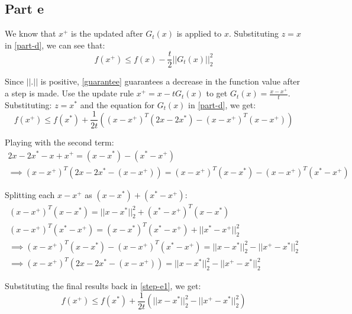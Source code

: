 \documentclass[10.5pt]{article}
\begin{document}
\begin{flushleft}
\subsection*{Part e}
We know that \(x^{+}\) is the updated after \(G_{t}(x)\) is applied to \(x\). Substituting \(z = x\) in \ref{part-d}, we can see that:
\begin{equation}
\label{guarantee}
f(x^{+}) \leq f(x) - \frac{t}{2}||G_{t}(x)||_{2}^{2}
\end{equation}

Since \(||.||\) is positive, \ref{guarantee} guarantees a decrease in the function value after a step is made. Use the update rule \(x^{+} = x - tG_{t}(x)\) to get \(G_{t}(x) = \frac{x - x^{+}}{t}\). Substituting: \(z = x^{*}\) and the equation for \(G_{t}(x)\) in \ref{part-d}, we get:
\begin{equation}
\label{step-e1}
f(x^{+}) \leq f(x^{*}) + \frac{1}{2t}\left((x - x^{+})^{T}(2x - 2x^{*}) - (x - x^{+})^{T}(x - x^{+})\right)
\end{equation}

Playing with the second term:
\begin{gather*}
2x - 2x^{*} - x + x^{+} = (x - x^{*}) - (x^{*} - x^{+}) \\
\implies (x - x^{+})^{T}(2x - 2x^{*} - (x - x^{+})) = (x - x^{+})^{T}(x - x^{*}) - (x - x^{+})^{T}(x^{*} - x^{+})
\end{gather*}

Splitting each \(x - x^{+}\) as \((x - x^{*}) + (x^{*} - x^{+})\):
\begin{gather*}
(x - x^{+})^{T}(x - x^{*}) = ||x - x^{*}||_{2}^{2} + (x^{*} - x^{+})^{T}(x - x^{*}) \\
(x - x^{+})^{T}(x^{*} - x^{+}) = (x - x^{*})^{T}(x^{*} - x^{+}) + ||x^{*} - x^{+}||_{2}^{2} \\
\implies (x - x^{+})^{T}(x - x^{*}) - (x - x^{+})^{T}(x^{*} - x^{+}) = ||x - x^{*}||_{2}^{2} - ||x^{+} - x^{*}||_{2}^{2} \\
\implies (x - x^{+})^{T}(2x - 2x^{*} - (x - x^{+})) = ||x - x^{*}||_{2}^{2} - ||x^{+} - x^{*}||_{2}^{2}
\end{gather*}

Substituting the final results back in \ref{step-e1}, we get:
\begin{equation}
\label{part-e}
f(x^{+}) \leq f(x^{*}) + \frac{1}{2t}\left(||x - x^{*}||_{2}^{2} - ||x^{+} - x^{*}||_{2}^{2}\right)
\end{equation}
\end{flushleft}
\end{document}

